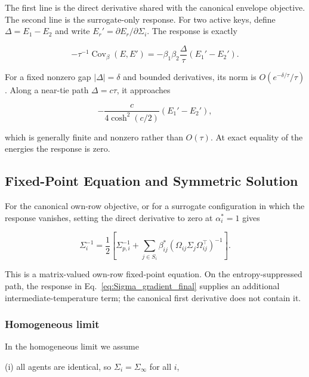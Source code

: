 \documentclass[twoside,11pt]{article}
\begin{document}
The first line is the direct derivative shared with the canonical envelope objective. The second line is the surrogate-only response. For two active keys, define $\Delta=E_1-E_2$ and write $E_r'=\partial E_r/\partial\Sigma_i$. The response is exactly

\begin{equation}
-\tau^{-1}\operatorname{Cov}_{\beta}(E,E')
=-\beta_1\beta_2\frac{\Delta}{\tau}(E_1'-E_2').
\label{eq:two_key_near_tie_response}
\end{equation}

For a fixed nonzero gap $|\Delta|=\delta$ and bounded derivatives, its norm is $O(e^{-\delta/\tau}/\tau)$. Along a near-tie path $\Delta=c\tau$, it approaches

\begin{equation}
-\frac{c}{4\cosh^2(c/2)}(E_1'-E_2'),
\label{eq:near_tie_scaled_limit}
\end{equation}

which is generally finite and nonzero rather than $O(\tau)$. At exact equality of the energies the response is zero.

\subsection{Fixed-Point Equation and Symmetric Solution}

For the canonical own-row objective, or for a surrogate configuration in which the response vanishes, setting the direct derivative to zero at $\alpha_i^*=1$ gives

\begin{equation}
\Sigma_i^{-1}
=\frac{1}{2}
\left[
\Sigma_{p,i}^{-1}
+ \sum_{j\in S_i} \beta_{ij}^*
(\Omega_{ij}\Sigma_j\Omega_{ij}^\top)^{-1}
\right].
\label{eq:sigma_fixed_point_beta}
\end{equation}

This is a matrix-valued own-row fixed-point equation. On the entropy-suppressed path, the response in Eq.~\eqref{eq:Sigma_gradient_final} supplies an additional intermediate-temperature term; the canonical first derivative does not contain it.

\subsubsection{Homogeneous limit}

In the homogeneous limit we assume

(i) all agents are identical, so $\Sigma_i = \Sigma_\infty$ for all $i$,
\end{document}

